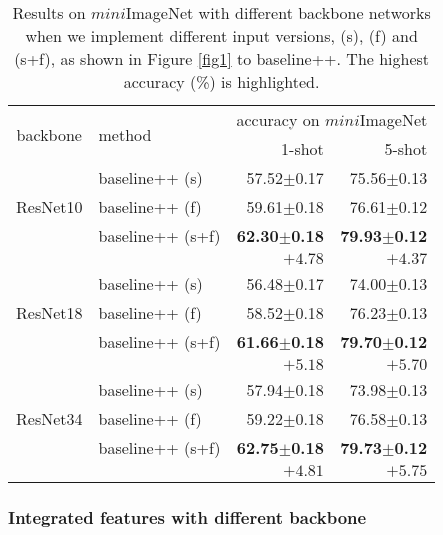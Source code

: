 \documentclass[10pt, conference, compsocconf]{IEEEtran}
\begin{document}
\begin{table}[t]
\centering
\caption{Results on $\textit{mini}$ImageNet with different backbone networks when we implement different input versions, (s), (f) and (s+f), as shown in Figure \ref{fig1} to baseline++. The highest accuracy (\%) is highlighted.}
\begin{tabular}{c|l|rr}
\toprule
\multirow{2}{*}{backbone} & \multirow{2}{*}{method} & \multicolumn{2}{c}{accuracy on $\textit{mini}$ImageNet} \\
& &1-shot&  5-shot\\ \hline
\multirow{3}{*}{ResNet10} 
& baseline++ (s) &  57.52$\pm$0.17 & 75.56$\pm$0.13 \\
& baseline++ (f) &  59.61$\pm$0.18 & 76.61$\pm$0.12 \\ 
& baseline++ (s+f) & {}{\bf{62.30$\pm$0.18}} & {}{\bf{79.93$\pm$0.12}}\\
&  & {}{$\textit{+4.78}$}&  {}{$\textit{+4.37}$} \\ \hline
\multirow{3}{*}{ResNet18}  & baseline++ (s) & 56.48$\pm$0.17 & 74.00$\pm$0.13 \\
& baseline++ (f)  & 58.52$\pm$0.18 & 76.23$\pm$0.13 \\
& baseline++ (s+f)  & {}{\bf{61.66$\pm$0.18}} & {}{\bf{79.70$\pm$0.12}} \\
&  & {}{$\textit{+5.18}$}&  {}{$\textit{+5.70}$} \\ \hline
\multirow{3}{*}{ResNet34} & baseline++ (s) & 57.94$\pm$0.18 & 73.98$\pm$0.13 \\
& baseline++ (f)  & 59.22$\pm$0.18 & 76.58$\pm$0.13 \\
& baseline++ (s+f) & {}{\bf{62.75$\pm$0.18}} & {}{\bf{79.73$\pm$0.12}} \\
&  & {}{$\textit{+4.81}$}&  {}{$\textit{+5.75}$} \\
\bottomrule
\end{tabular}
\label{table4}
\end{table}



\subsubsection{Integrated features with different backbone}
\end{document}
